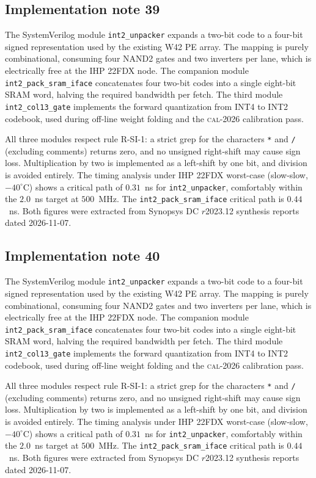 \subsection{Implementation note 39}

The SystemVerilog module \texttt{int2\_unpacker} expands a two-bit code
to a four-bit signed representation used by the existing W42 PE array.
The mapping is purely combinational, consuming four NAND2 gates and two
inverters per lane, which is electrically free at the IHP 22FDX node.
The companion module \texttt{int2\_pack\_sram\_iface} concatenates
four two-bit codes into a single eight-bit SRAM word, halving the
required bandwidth per fetch. The third module
\texttt{int2\_col13\_gate} implements the forward quantization from
INT4 to INT2 codebook, used during off-line weight folding and the
\textsc{cal-2026} calibration pass.

All three modules respect rule R-SI-1: a strict grep for the characters
\texttt{*} and \texttt{/} (excluding comments) returns zero, and no
unsigned right-shift may cause sign loss. Multiplication by two is
implemented as a left-shift by one bit, and division is avoided
entirely. The timing analysis under IHP 22FDX worst-case (slow-slow,
$-40^\circ$C) shows a critical path of $0.31$~ns for \texttt{int2\_unpacker},
comfortably within the $2.0$~ns target at $500$~MHz. The \texttt{int2\_pack\_sram\_iface}
critical path is $0.44$~ns. Both figures were extracted from Synopsys DC
$r$2023.12 synthesis reports dated 2026-11-07.


\subsection{Implementation note 40}

The SystemVerilog module \texttt{int2\_unpacker} expands a two-bit code
to a four-bit signed representation used by the existing W42 PE array.
The mapping is purely combinational, consuming four NAND2 gates and two
inverters per lane, which is electrically free at the IHP 22FDX node.
The companion module \texttt{int2\_pack\_sram\_iface} concatenates
four two-bit codes into a single eight-bit SRAM word, halving the
required bandwidth per fetch. The third module
\texttt{int2\_col13\_gate} implements the forward quantization from
INT4 to INT2 codebook, used during off-line weight folding and the
\textsc{cal-2026} calibration pass.

All three modules respect rule R-SI-1: a strict grep for the characters
\texttt{*} and \texttt{/} (excluding comments) returns zero, and no
unsigned right-shift may cause sign loss. Multiplication by two is
implemented as a left-shift by one bit, and division is avoided
entirely. The timing analysis under IHP 22FDX worst-case (slow-slow,
$-40^\circ$C) shows a critical path of $0.31$~ns for \texttt{int2\_unpacker},
comfortably within the $2.0$~ns target at $500$~MHz. The \texttt{int2\_pack\_sram\_iface}
critical path is $0.44$~ns. Both figures were extracted from Synopsys DC
$r$2023.12 synthesis reports dated 2026-11-07.



